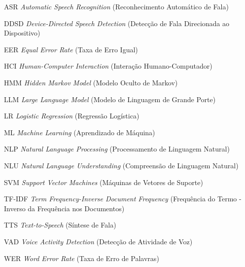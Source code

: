 \documentclass[
    12pt,                %
    openright,           %
    oneside,             %
    a4paper,             %
    english,             %
    brazil               %
]{abntex2}
\begin{document}
\begin{siglas}
  \item[ASR] \textit{Automatic Speech Recognition} (Reconhecimento Automático de Fala)
  \item[DDSD] \textit{Device-Directed Speech Detection} (Detecção de Fala Direcionada ao Dispositivo)
  \item[EER] \textit{Equal Error Rate} (Taxa de Erro Igual)
  \item[HCI] \textit{Human-Computer Interaction} (Interação Humano-Computador)
  \item[HMM] \textit{Hidden Markov Model} (Modelo Oculto de Markov)
  \item[LLM] \textit{Large Language Model} (Modelo de Linguagem de Grande Porte)
  \item[LR] \textit{Logistic Regression} (Regressão Logística)
  \item[ML] \textit{Machine Learning} (Aprendizado de Máquina)
  \item[NLP] \textit{Natural Language Processing} (Processamento de Linguagem Natural)
  \item[NLU] \textit{Natural Language Understanding} (Compreensão de Linguagem Natural)
  \item[SVM] \textit{Support Vector Machines} (Máquinas de Vetores de Suporte)
  \item[TF-IDF] \textit{Term Frequency-Inverse Document Frequency} (Frequência do Termo - Inverso da Frequência nos Documentos)
  \item[TTS] \textit{Text-to-Speech} (Síntese de Fala)
  \item[VAD] \textit{Voice Activity Detection} (Detecção de Atividade de Voz)
  \item[WER] \textit{Word Error Rate} (Taxa de Erro de Palavras)
\end{siglas}
\cleardoublepage

\tableofcontents*
\cleardoublepage

\textual

\end{document}
